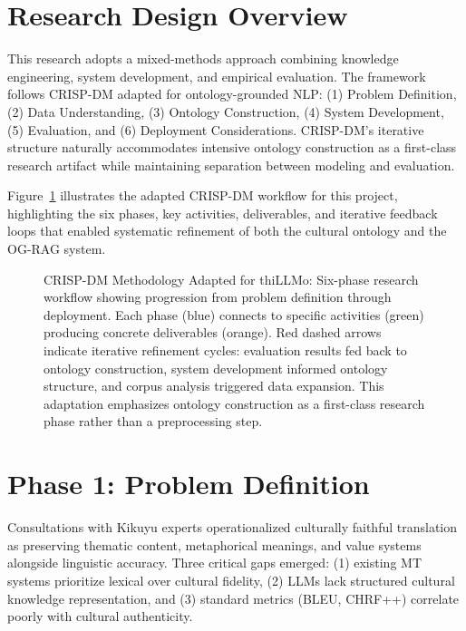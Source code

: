 \label{chap:methodology}

\section{Research Design Overview}
\label{sec:research_design}

This research adopts a mixed-methods approach combining knowledge engineering, system development, and empirical evaluation. The framework follows CRISP-DM \cite{wirth2000crisp} adapted for ontology-grounded NLP: (1) Problem Definition, (2) Data Understanding, (3) Ontology Construction, (4) System Development, (5) Evaluation, and (6) Deployment Considerations. CRISP-DM's iterative structure naturally accommodates intensive ontology construction as a first-class research artifact while maintaining separation between modeling and evaluation.

Figure~\ref{fig:methodology_overview} illustrates the adapted CRISP-DM workflow for this project, highlighting the six phases, key activities, deliverables, and iterative feedback loops that enabled systematic refinement of both the cultural ontology and the OG-RAG system.

\begin{figure}[htbp]
\centering
\resizebox{0.95\textwidth}{!}{}
\caption{CRISP-DM Methodology Adapted for thiLLMo: Six-phase research workflow showing progression from problem definition through deployment. Each phase (blue) connects to specific activities (green) producing concrete deliverables (orange). Red dashed arrows indicate iterative refinement cycles: evaluation results fed back to ontology construction, system development informed ontology structure, and corpus analysis triggered data expansion. This adaptation emphasizes ontology construction as a first-class research phase rather than a preprocessing step.}
\label{fig:methodology_overview}
\end{figure}

\section{Phase 1: Problem Definition}
\label{sec:phase_business}

Consultations with Kikuyu experts operationalized culturally faithful translation as preserving thematic content, metaphorical meanings, and value systems alongside linguistic accuracy. Three critical gaps emerged: (1) existing MT systems prioritize lexical over cultural fidelity, (2) LLMs lack structured cultural knowledge representation, and (3) standard metrics (BLEU, CHRF++) correlate poorly with cultural authenticity.

